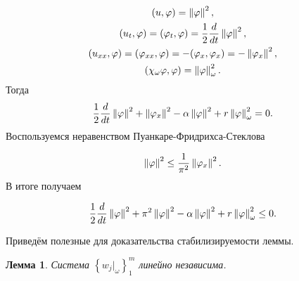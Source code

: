 \begin{gather*}
    (u, \varphi) = \left\lVert\varphi\right\rVert^2,\\*
    (u_t, \varphi) = (\varphi_t, \varphi) = \frac{1}{2} \frac{d}{dt}
    \left\lVert\varphi\right\rVert^2, \\*
    (u_{xx}, \varphi) = (\varphi_{xx}, \varphi) = -(\varphi_x, \varphi_x) = -
    \left\lVert\varphi_x\right\rVert^2, \\*
    (\chi_{\omega}\varphi, \varphi) = \left\lVert\varphi\right\rVert^2_{\omega}.
\end{gather*}
Тогда
\begin{equation*}
    \frac{1}{2} \frac{d}{dt} \left\lVert\varphi\right\rVert^2  + \left\lVert\varphi_x\right\rVert^2 - 
    \alpha \left\lVert\varphi\right\rVert^2 + r \left\lVert\varphi\right\rVert^2_{\omega} = 0.
\end{equation*}
Воспользуемся неравенством Пуанкаре-Фридрихса-Стеклова

\begin{equation}
    \left\lVert\varphi\right\rVert^2 \le \frac{1}{\pi^2} \left\lVert\varphi_x\right\rVert^2.
\end{equation}
В итоге получаем

\begin{equation}
    \frac{1}{2} \frac{d}{dt} \left\lVert\varphi\right\rVert^2 + \pi^2 \left\lVert\varphi\right\rVert^2 - 
    \alpha \left\lVert\varphi\right\rVert^2 + r \left\lVert\varphi\right\rVert^2_{\omega} \le 0.
\end{equation}

Приведём полезные для доказательства стабилизируемости леммы.

\newtheorem{lemma}{Лемма}

\begin{lemma}\label{util_lemma}
    Система $\left\{ w_j|_{\omega} \right\}^m_1$ линейно независима.
\end{lemma}

